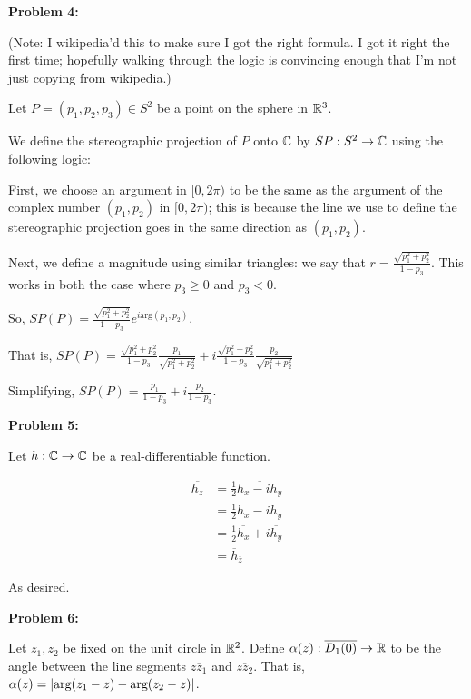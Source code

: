 \documentclass[a4paper,12pt]{article}
\begin{document}
{\bf Problem 4:}

(Note: I wikipedia'd this to make sure I got the right formula. I got it right the first time; hopefully walking through the logic is convincing enough that I'm not just copying from wikipedia.)

Let $P = (p_1,p_2,p_3) \in S^2$ be a point on the sphere in $\mathbb{R}^3$.

We define the stereographic projection of $P$ onto $\mathbb{C}$ by $SP: S^2 \to \mathbb{C}$ using the following logic:

First, we choose an argument in $[0, 2\pi)$ to be the same as the argument of the complex number $(p_1,p_2)$ in $[0,2\pi)$; this is because the line we use to define the stereographic projection goes in the same direction as $(p_1, p_2)$.

\shunt %

Next, we define a magnitude using similar triangles: we say that $r = \frac{\sqrt{p_1^2 + p_2^2}}{1-p_3}$. This works in both the case where $p_3\geq 0$ and $p_3 < 0$.

So, $SP(P) = \frac{\sqrt{p_1^2 + p_2^2}}{1-p_3} e^{i \text{arg}(p_1,p_2)}$.

\shunt %

That is, $SP(P) = \frac{\sqrt{p_1^2 + p_2^2}}{1-p_3} \frac{p_1}{\sqrt{p_1^2+p_2^2}} + i\frac{\sqrt{p_1^2 + p_2^2}}{1-p_3} \frac{p_2}{\sqrt{p_1^2+p_2^2}}$

Simplifying, $SP(P) = \frac{p_1}{1-p_3} + i \frac{p_2}{1-p_3}$.

\shunt

{\bf Problem 5:}

Let $h: \mathbb{C} \to \mathbb{C}$ be a real-differentiable function.

\begin{align*}
\overline{h_z} &= \frac{1}{2} \overline{h_x-ih_y}\\
&= \frac{1}{2} \overline{h_x}-\overline{ih_y}\\
&= \frac{1}{2} \overline{h_x}+i\overline{h_y}\\
&= \overline{h}_{\overline{z}}
\end{align*}

As desired.

\shunt

{\bf Problem 6:}

Let $z_1,z_2$ be fixed on the unit circle in $\mathbb{R}^2$. Define $\alpha(z): \overline{D_1(0)} \to \mathbb{R}$ to be the angle between the line segments $\overline{zz_1}$ and $\overline{zz_2}$. That is, $\alpha(z) = \left\lvert \text{arg}(z_1-z) - \text{arg}(z_2-z) \right\rvert$.
\end{document}
